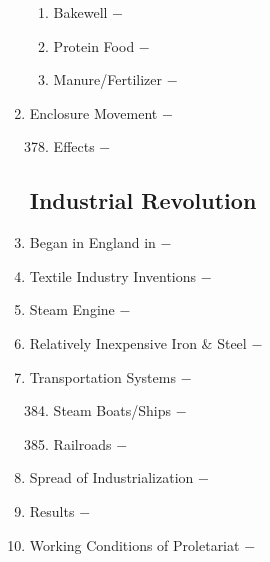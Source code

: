 \documentclass[12pt]{article}
\begin{document}
\begin{enumerate}
\begin{enumerate}[label=\arabic{*}.]
\item Bakewell $-$

\item Protein Food $-$

\item Manure/Fertilizer $-$ 


\end{enumerate}
\setcounter{enumi}{376}

\item Enclosure Movement $-$ 

\begin{enumerate}[label=\arabic{*}.]
\setcounter{enumii}{377}

\item Effects $-$ 

\end{enumerate}
\setcounter{enumi}{378}

\subsection{Industrial Revolution}

\item Began in England in $-$ 

\item Textile Industry Inventions $-$ 

\item Steam Engine $-$ 

\item Relatively Inexpensive Iron \& Steel $-$

\item Transportation Systems $-$

\begin{enumerate}[label=\arabic{*}.]
\setcounter{enumii}{383}

\item Steam Boats/Ships $-$

\item Railroads $-$ 


\end{enumerate}
\setcounter{enumi}{385}

\item Spread of Industrialization $-$ 

\item Results $-$ 

\item Working Conditions of Proletariat $-$ 

\begin{enumerate}[label=\arabic{*}.]
\setcounter{enumii}{388}


\end{enumerate}
\end{enumerate}
\end{document}
